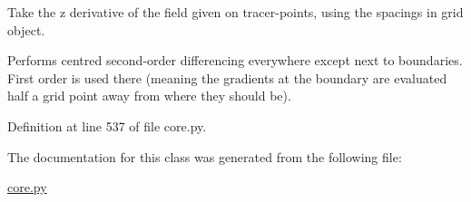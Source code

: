 Take the z derivative of the field given on tracer-\/points, using the spacings in grid object. 

Performs centred second-\/order differencing everywhere except next to boundaries. First order is used there (meaning the gradients at the boundary are evaluated half a grid point away from where they should be). 

Definition at line 537 of file core.\+py.



The documentation for this class was generated from the following file\+:\begin{DoxyCompactItemize}
\item 
\hyperlink{core_8py}{core.\+py}\end{DoxyCompactItemize}
